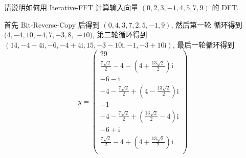 \documentclass[boxes]{homework}
\begin{document}
\begin{problem}
请说明如何用 {\sc Iterative-FFT} 计算输入向量 $(0, 2, 3, -1, 4, 5, 7, 9)$ 的
DFT\@.
\end{problem}
\begin{solution}
    首先 {\sc Bit-Reverse-Copy} 后得到 $(0, 4, 3, 7, 2, 5, -1, 9)$, 然后第一轮
    循环得到 $(4, -4, 10, -4, 7, -3, 8,$ $-10)$, 第二轮循环得到 $(14, -4 -
        4 \mathrm{i}, -6, -4 + 4 \mathrm{i}, 15, -3 - 10 \mathrm{i}, -1,
        -3 + 10\mathrm{i})$, 最后一轮循环得到
    \begin{equation}
        y =
        \begin{pmatrix}
            29                                              \\
            \frac{ 7 \sqrt{2} }{ 2 } - 4 - \left(4 +
            \frac{ 13 \sqrt{2} }{ 2 }\right) \mathrm{i}     \\
            -6 - \mathrm{i}                                 \\
            - 4 - \frac{ 7 \sqrt{2} }{ 2 } + \left(4 -
            \frac{ 13 \sqrt{2} }{ 2 }\right) \mathrm{i}     \\
            -1                                              \\
            - 4 - \frac{ 7 \sqrt{2} }{ 2 } + \left(
            \frac{ 13 \sqrt{2} }{ 2 } - 4\right) \mathrm{i} \\
            -6 + \mathrm{i}                                 \\
            \frac{ 7 \sqrt{2} }{ 2 } - 4 + \left(4 +
            \frac{ 13 \sqrt{2} }{ 2 }\right) \mathrm{i}     \\
        \end{pmatrix}
    \end{equation}
\end{solution}
\end{document}
